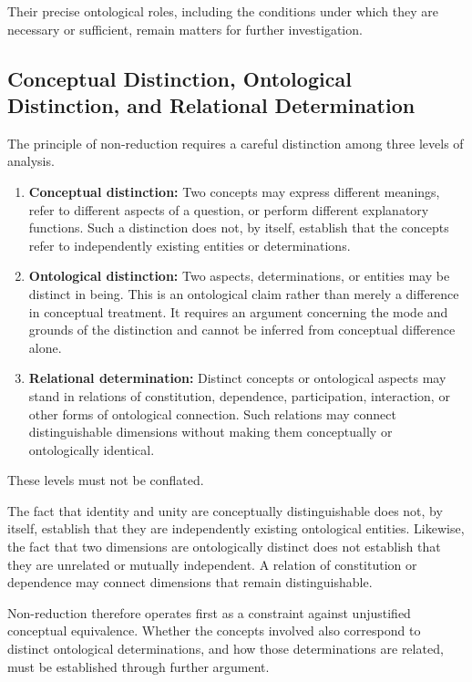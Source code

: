 Their precise ontological roles, including the conditions
under which they are necessary or sufficient, remain
matters for further investigation.

\subsection{Conceptual Distinction, Ontological Distinction, and Relational Determination}

The principle of non-reduction requires a careful distinction
among three levels of analysis.

\begin{enumerate}
    \item \textbf{Conceptual distinction:}
    Two concepts may express different meanings, refer to
    different aspects of a question, or perform different
    explanatory functions. Such a distinction does not,
    by itself, establish that the concepts refer to
    independently existing entities or determinations.

    \item \textbf{Ontological distinction:}
    Two aspects, determinations, or entities may be
    distinct in being. This is an ontological claim rather
    than merely a difference in conceptual treatment.
    It requires an argument concerning the mode and grounds
    of the distinction and cannot be inferred from
    conceptual difference alone.

    \item \textbf{Relational determination:}
    Distinct concepts or ontological aspects may stand
    in relations of constitution, dependence, participation,
    interaction, or other forms of ontological connection.
    Such relations may connect distinguishable dimensions
    without making them conceptually or ontologically
    identical.
\end{enumerate}

These levels must not be conflated.

The fact that identity and unity are conceptually
distinguishable does not, by itself, establish that they
are independently existing ontological entities. Likewise,
the fact that two dimensions are ontologically distinct
does not establish that they are unrelated or mutually
independent. A relation of constitution or dependence
may connect dimensions that remain distinguishable.

Non-reduction therefore operates first as a constraint
against unjustified conceptual equivalence. Whether the
concepts involved also correspond to distinct ontological
determinations, and how those determinations are related,
must be established through further argument.

